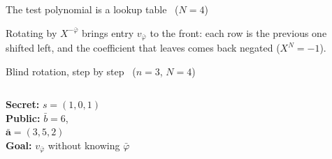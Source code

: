 \documentclass[aspectratio=169,11pt]{beamer}
\newcommand{\muted}[1]{{\color{cGray}#1}}
\begin{document}
\begin{frame}{The test polynomial is a lookup table \ \muted{\normalsize($N=4$)}}
\centering


\vspace{4pt}
\small Rotating by $X^{-\bar\varphi}$ brings entry $v_{\bar\varphi}$ to the front: each row is
the previous one shifted left, and the coefficient that leaves \alert{comes back negated} ($X^N=-1$).
\end{frame}

\begin{frame}{Blind rotation, step by step \ \muted{\normalsize($n=3$, $N=4$)}}
\begin{columns}[c,onlytextwidth]
\small
\textbf{Secret:} $s=(1,0,1)$\\[6pt]
\textbf{Public:} $\bar b=6$,\\ $\bar{\mathbf a}=(3,5,2)$\\[6pt]
\textbf{Goal:} $v_{\bar\varphi}$ without knowing $\bar\varphi$
\centering
\scalebox{0.92}{}
\end{columns}
\end{frame}
\end{document}

